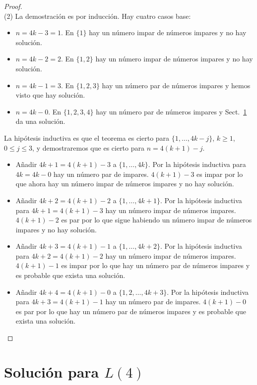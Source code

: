 \begin{proof}
\mbox{}\\
(2)
La demostración es por inducción.
Hay cuatro casos base:
\begin{itemize}
\item $n=4k-3=1$. En $\{1\}$ hay un número impar de números impares y no hay solución.
\item $n=4k-2=2$. En $\{1,2\}$ hay un número impar de números impares y no hay solución.
\item $n=4k-1=3$. En $\{1,2,3\}$ hay un número par de números impares y hemos visto que hay solución.
\item $n=4k-0$. En $\{1,2,3,4\}$ hay un número par de números impares y Sect.~\ref{s.langford-four} da una solución.
\end{itemize}

La hipótesis inductiva es que el teorema es cierto para $\{1,\ldots,4k-j\}$, $k\ge 1$, $0\leq j\leq 3$, y demostraremos que es cierto para $n=4(k+1)-j$.

\begin{itemize}
\item Añadir $4k+1=4(k+1)-3$ a $\{1,\ldots,4k\}$. Por la hipótesis inductiva para $4k=4k-0$ hay un número par de impares. $4(k+1)-3$ es impar por lo que ahora hay un número impar de números impares y no hay solución.
\item Añadir $4k+2=4(k+1)-2$ a $\{1,\ldots,4k+1\}$. Por la hipótesis inductiva para $4k+1=4(k+1)-3$ hay un número impar de números impares. $4(k+1)-2$ es par por lo que sigue habiendo un número impar de números impares y no hay solución.
\item Añadir $4k+3=4(k+1)-1$ a $\{1,\ldots,4k+2\}$. Por la hipótesis inductiva para $4k+2=4(k+1)-2$ hay un número impar de números impares. $4(k+1)-1$ es impar por lo que hay un número par de números impares y es probable que exista una solución.
\item Añadir $4k+4=4(k+1)-0$ a $\{1,2,\ldots,4k+3\}$. Por la hipótesis inductiva para $4k+3=4(k+1)-1$ hay un número par de impares. $4(k+1)-0$ es par por lo que hay un número par de números impares y es probable que exista una solución.
\end{itemize}
\end{proof}


\section{Solución para $L(4)$}\label{s.langford-four}

